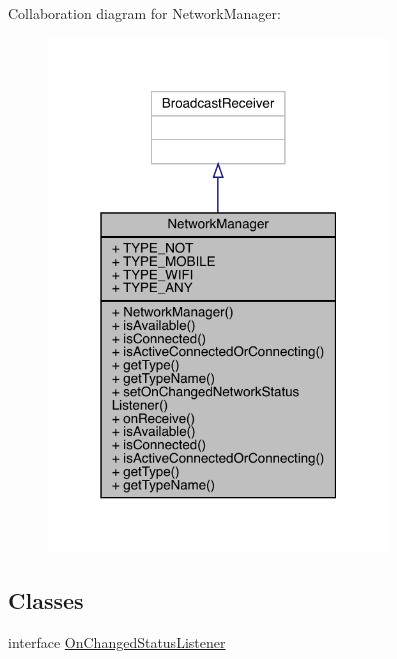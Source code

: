 Collaboration diagram for Network\+Manager\+:
\nopagebreak
\begin{figure}[H]
\begin{center}
\leavevmode
\includegraphics[width=256pt]{classcom_1_1toast_1_1android_1_1gamebase_1_1base_1_1_network_manager__coll__graph}
\end{center}
\end{figure}
\subsection*{Classes}
\begin{DoxyCompactItemize}
\item 
interface \hyperlink{interfacecom_1_1toast_1_1android_1_1gamebase_1_1base_1_1_network_manager_1_1_on_changed_status_listener}{On\+Changed\+Status\+Listener}
\end{DoxyCompactItemize}
